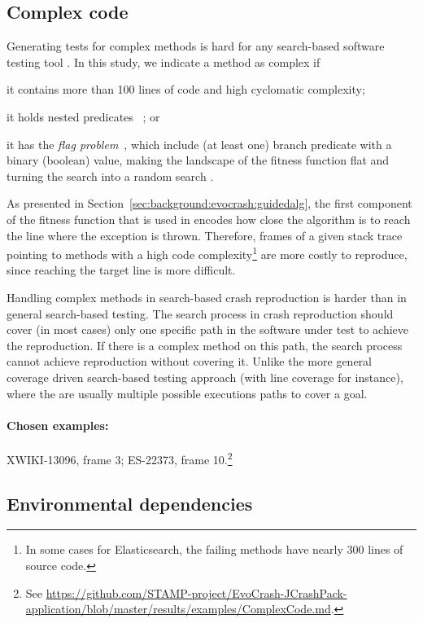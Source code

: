 \subsection{Complex code}

Generating tests for complex methods is hard for any search-based software testing tool \cite{MarkFlag}. In this study, we indicate a method as complex if 
\begin{inparaenum}[(i)]
\item it contains more than 100 lines of code and high cyclomatic complexity; 
\item it holds nested predicates ~\cite{GordonFlag, MarkFlag}; or
\item it has the \textit{flag problem}~\cite{GordonFlag,McMinn2011}, which include (at least one) branch predicate with a binary (boolean) value, making the landscape of the fitness function flat and turning the search into a random search \cite{MarkFlag}.
\end{inparaenum}

As presented in Section~\ref{sec:background:evocrash:guidedalg}, the first component of the fitness function that is used in \evocrash encodes how close the algorithm is to reach the line where the exception is thrown.
Therefore, frames of a given stack trace pointing to methods with a high code complexity\footnote{In some cases for Elasticsearch, the failing methods have nearly 300 lines of source code.} are more costly to reproduce, since reaching the target line is more difficult.  

Handling complex methods in search-based crash reproduction is harder than in general search-based testing. 
The search process in crash reproduction should cover (in most cases) only one specific path in the software under test to achieve the reproduction. 
If there is a complex method on this path, the search process cannot achieve reproduction without covering it. 
Unlike the more general coverage driven search-based testing approach (with line coverage for instance), where the are usually multiple possible executions paths to cover a goal.

\paragraph{Chosen examples:} 
XWIKI-13096, frame 3;
ES-22373, frame 10.\footnote{See \url{https://github.com/STAMP-project/EvoCrash-JCrashPack-application/blob/master/results/examples/ComplexCode.md}.}


\subsection{Environmental dependencies} 

